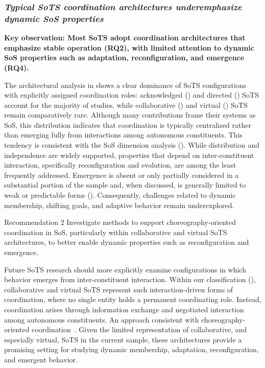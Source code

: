 \subsubsection{\textit{Typical SoTS coordination architectures underemphasize dynamic SoS properties}}

\textbf{Key observation: Most SoTS adopt coordination architectures that emphasize stable operation (RQ2), with limited attention to dynamic SoS properties such as adaptation, reconfiguration, and emergence (RQ4).}

The architectural analysis in  shows a clear dominance of SoTS configurations with explicitly assigned coordination roles: acknowledged () and directed () SoTS account for the majority of studies, while collaborative () and virtual () SoTS remain comparatively rare. Although many contributions frame their systems as SoS, this distribution indicates that coordination is typically centralized rather than emerging fully from interactions among autonomous constituents. This tendency is consistent with the SoS dimension analysis (). While distribution and independence are widely supported, properties that depend on inter-constituent interaction, specifically reconfiguration and evolution, are among the least frequently addressed. Emergence is absent or only partially considered in a substantial portion of the sample and, when discussed, is generally limited to weak or predictable forms (). Consequently, challenges related to dynamic membership, shifting goals, and adaptive behavior remain underexplored.

\begin{recoframe}{Recommendation 2}
Investigate methods to support choreography-oriented coordination in SoS, particularly within collaborative and virtual SoTS architectures, to better enable dynamic properties such as reconfiguration and emergence.
\end{recoframe}

Future SoTS research should more explicitly examine configurations in which behavior emerges from inter-constituent interaction. Within our classification (), collaborative and virtual SoTS represent such interaction-driven forms of coordination, where no single entity holds a permanent coordinating role. Instead, coordination arises through information exchange and negotiated interaction among autonomous constituents. An approach consistent with choreography-oriented coordination~\cite{peltz2003web}. Given the limited representation of collaborative, and especially virtual, SoTS in the current sample, these architectures provide a promising setting for studying dynamic membership, adaptation, reconfiguration, and emergent behavior.

